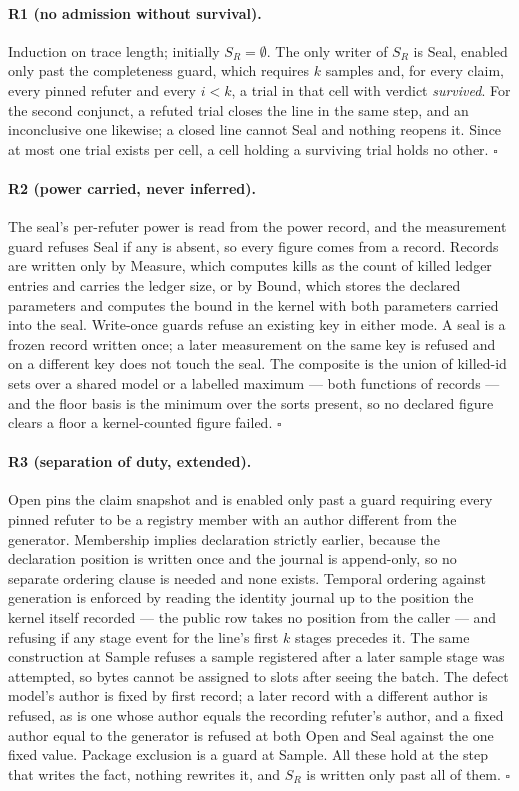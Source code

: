 \documentclass[11pt,a4paper]{article}
\theoremstyle{plain}
\theoremstyle{definition}
\theoremstyle{remark}
\newcommand{\SR}{\ensuremath{S_R}}
\begin{document}
\paragraph{R1 (no admission without survival).} Induction on trace length; initially $\SR=\emptyset$. The only writer of $\SR$ is Seal, enabled only past the completeness guard, which requires $k$ samples and, for every claim, every pinned refuter and every $i<k$, a trial in that cell with verdict \emph{survived}. For the second conjunct, a refuted trial closes the line in the same step, and an inconclusive one likewise; a closed line cannot Seal and nothing reopens it. Since at most one trial exists per cell, a cell holding a surviving trial holds no other. $\square$

\paragraph{R2 (power carried, never inferred).} The seal's per-refuter power is read from the power record, and the measurement guard refuses Seal if any is absent, so every figure comes from a record. Records are written only by Measure, which computes kills as the count of killed ledger entries and carries the ledger size, or by Bound, which stores the declared parameters and computes the bound in the kernel with both parameters carried into the seal. Write-once guards refuse an existing key in either mode. A seal is a frozen record written once; a later measurement on the same key is refused and on a different key does not touch the seal. The composite is the union of killed-id sets over a shared model or a labelled maximum --- both functions of records --- and the floor basis is the minimum over the sorts present, so no declared figure clears a floor a kernel-counted figure failed. $\square$

\paragraph{R3 (separation of duty, extended).} Open pins the claim snapshot and is enabled only past a guard requiring every pinned refuter to be a registry member with an author different from the generator. Membership implies declaration strictly earlier, because the declaration position is written once and the journal is append-only, so no separate ordering clause is needed and none exists. Temporal ordering against generation is enforced by reading the identity journal up to the position the kernel itself recorded --- the public row takes no position from the caller --- and refusing if any stage event for the line's first $k$ stages precedes it. The same construction at Sample refuses a sample registered after a later sample stage was attempted, so bytes cannot be assigned to slots after seeing the batch. The defect model's author is fixed by first record; a later record with a different author is refused, as is one whose author equals the recording refuter's author, and a fixed author equal to the generator is refused at both Open and Seal against the one fixed value. Package exclusion is a guard at Sample. All these hold at the step that writes the fact, nothing rewrites it, and $\SR$ is written only past all of them. $\square$
\end{document}
